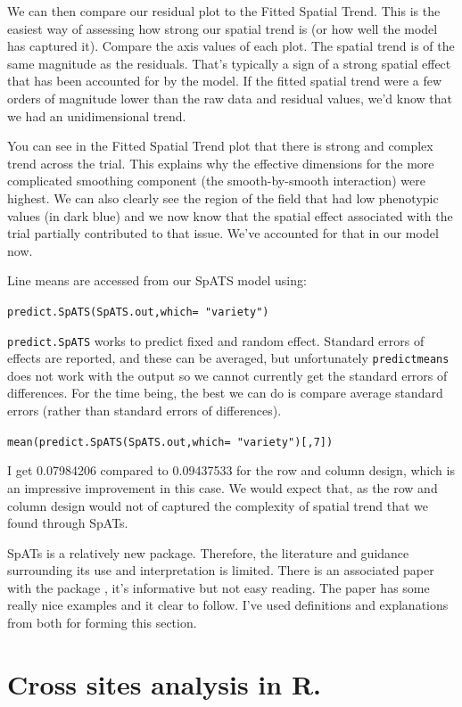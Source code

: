 \documentclass[
]{book}
\begin{document}
We can then compare our residual plot to the Fitted Spatial Trend. This is the easiest way of assessing how strong our spatial trend is (or how well the model has captured it). Compare the axis values of each plot. The spatial trend is of the same magnitude as the residuals. That's typically a sign of a strong spatial effect that has been accounted for by the model. If the fitted spatial trend were a few orders of magnitude lower than the raw data and residual values, we'd know that we had an unidimensional trend.

You can see in the Fitted Spatial Trend plot that there is strong and complex trend across the trial. This explains why the effective dimensions for the more complicated smoothing component (the smooth-by-smooth interaction) were highest. We can also clearly see the region of the field that had low phenotypic values (in dark blue) and we now know that the spatial effect associated with the trial partially contributed to that issue. We've accounted for that in our model now.

Line means are accessed from our SpATS model using:

\texttt{predict.SpATS(SpATS.out,which=\ "variety")}

\texttt{predict.SpATS} works to predict fixed and random effect. Standard errors of effects are reported, and these can be averaged, but unfortunately \texttt{predictmeans} does not work with the output so we cannot currently get the standard errors of differences. For the time being, the best we can do is compare average standard errors (rather than standard errors of differences).

\texttt{mean(predict.SpATS(SpATS.out,which=\ "variety"){[},7{]})}

I get 0.07984206 compared to 0.09437533 for the row and column design, which is an impressive improvement in this case. We would expect that, as the row and column design would not of captured the complexity of spatial trend that we found through SpATs.

SpATs is a relatively new package. Therefore, the literature and guidance surrounding its use and interpretation is limited. There is an associated paper with the package \citep{rodríguezálvarez2016}, it's informative but not easy reading. The paper \citet{velazco_modelling_2017} has some really nice examples and it clear to follow. I've used definitions and explanations from both for forming this section.

\hypertarget{Cross-site-analysis}{%
\chapter{Cross sites analysis in R.}\label{Cross-site-analysis}}
\end{document}
